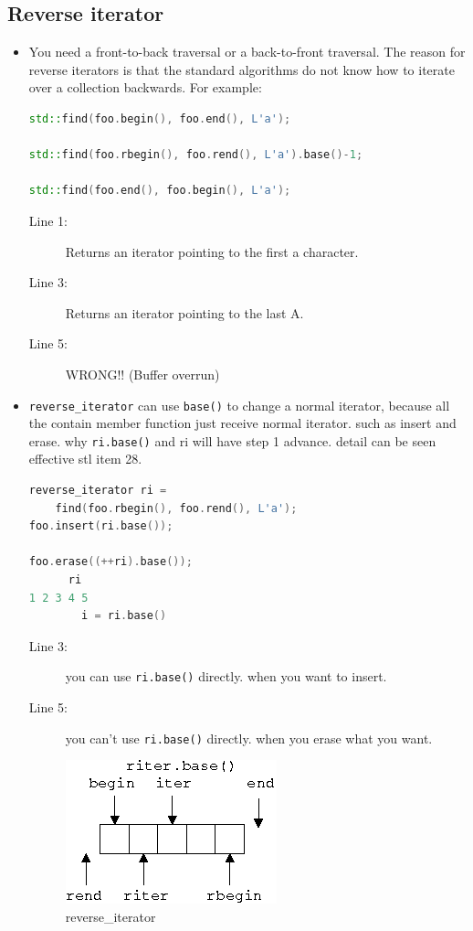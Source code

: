 \documentclass[a4paper,11pt,twoside]{book}
\begin{document}
\subsection{Reverse iterator}
\begin{itemize}
\item You need a front-to-back traversal or a back-to-front traversal. The reason for reverse iterators is that the standard algorithms do not know how to iterate over a collection backwards. For example:
\begin{lstlisting}[frame=single, language=c++]
std::find(foo.begin(), foo.end(), L'a');

std::find(foo.rbegin(), foo.rend(), L'a').base()-1;

std::find(foo.end(), foo.begin(), L'a');
\end{lstlisting}
\begin{description}
	\item[Line 1:] Returns an iterator pointing to the first a character.
	\item[Line 3:] Returns an iterator pointing to the last A.
	\item[Line 5:] WRONG!! (Buffer overrun)
\end{description}
\item \texttt{reverse\_iterator} can use \texttt{base()} to change a normal iterator, because all the contain member function just receive normal iterator. such as insert and erase.
why \texttt{ri.base()} and ri will have step 1 advance. detail can be seen effective stl item 28.
\begin{lstlisting}[frame=single, language=c++]
reverse_iterator ri =
    find(foo.rbegin(), foo.rend(), L'a');
foo.insert(ri.base()); 
                          
foo.erase((++ri).base()); 
      ri
1 2 3 4 5
        i = ri.base()
\end{lstlisting}
\begin{description}
	\item[Line 3:] you can use \texttt{ri.base()} directly. when you want to insert.
	\item[Line 5:] you can't use \texttt{ri.base()} directly. when you erase what you want.
\end{description}

\begin{figure}
	\centering
	\includegraphics[width=0.3\linewidth]{pics/ri.png}
	\caption{reverse\_iterator }
	\label{fig:ri}
\end{figure}


\end{itemize}
\end{document}
